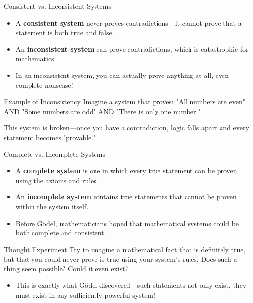 \documentclass[aspectratio=169]{beamer}
\begin{document}
\begin{frame}{Consistent vs. Inconsistent Systems}

\begin{itemize}
    \item A \textbf{consistent system} never proves contradictions—it cannot prove that a statement is both true and false.
    \item An \textbf{inconsistent system} can prove contradictions, which is catastrophic for mathematics.
    \item In an inconsistent system, you can actually prove anything at all, even complete nonsense!
\end{itemize}

\begin{alertblock}{Example of Inconsistency}
Imagine a system that proves: "All numbers are even" AND "Some numbers are odd" AND "There is only one number."

This system is broken—once you have a contradiction, logic falls apart and every statement becomes "provable."
\end{alertblock}

\end{frame}

\begin{frame}{Complete vs. Incomplete Systems}

\begin{itemize}
    \item A \textbf{complete system} is one in which every true statement can be proven using the axioms and rules.
    \item An \textbf{incomplete system} contains true statements that cannot be proven within the system itself.
    \item Before Gödel, mathematicians hoped that mathematical systems could be both complete and consistent.
\end{itemize}

\begin{block}{Thought Experiment}
Try to imagine a mathematical fact that is definitely true, but that you could never prove is true using your system's rules. Does such a thing seem possible? Could it even exist?
\end{block}

\begin{itemize}
    \item This is exactly what Gödel discovered—such statements not only exist, they must exist in any sufficiently powerful system!
\end{itemize}

\end{frame}
\end{document}
